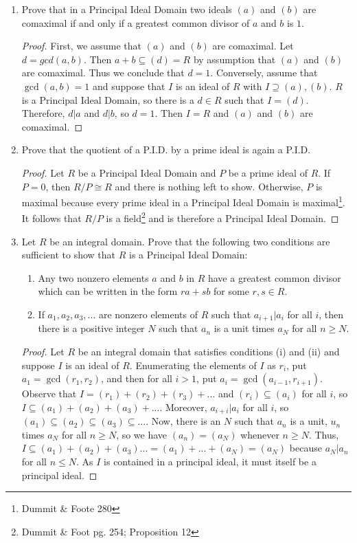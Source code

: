 \documentclass{report}
\begin{document}
\begin{enumerate}
	\item Prove that in a Principal Ideal Domain two ideals $(a)$ and $(b)$ are comaximal if and only if a greatest common divisor of $a$ and $b$ is $1$.
	\begin{proof}
		First, we assume that $(a)$ and $(b)$ are comaximal. Let $d=gcd(a,b)$. 
		Then $a+b\subseteq(d)=R$ by assumption that $(a)$ and $(b)$ are comaximal.
		Thus we conclude that $d=1$.
		Conversely, assume that $\gcd(a,b)=1$ and suppose that $I$ is an ideal of $R$ with $I\supseteq(a),(b)$.
		$R$ is a Principal Ideal Domain, so there is a $d\in R$ such that $I=(d)$.
		Therefore, $d|a$ and $d|b$, so $d=1$. Then $I=R$ and $(a)$ and $(b)$ are comaximal.
	\end{proof}
		
	\setcounter{enumi}{2} 
	\item Prove that the quotient of a P.I.D. by a prime ideal is again a P.I.D.
	\begin{proof}
	   Let $R$ be a Principal Ideal Domain and $P$ be a prime ideal of $R$. 
	   If $P=0$, then $R/P\cong R$ and there is nothing left to show.
	   Otherwise, $P$ is maximal because every prime ideal in a Principal Ideal Domain is maximal\footnote{Dummit \& Foote 280}.
	   It follows that $R/P$ is a field\footnote{Dummit \& Foot pg. 254; Proposition 12} and is therefore a Principal Ideal Domain.
	\end{proof}
	
	\item Let $R$ be an integral domain. Prove that the following two conditions are sufficient to show that $R$ is a Principal Ideal Domain:
		\begin{enumerate}[label=(\roman*)]
		\item Any two nonzero elements $a$ and $b$ in $R$ have a greatest common divisor which can be written in the form $ra +sb$ for some $r,s\in R$.
		\item If $a_1,a_2,a_3,...$ are nonzero elements of $R$ such that $a_{i+1}|a_i$ for all $i$,
		then there is a positive integer $N$ such that $a_n$ is a unit times $a_N$ for all $n\geq N$.
	\end{enumerate}
	\begin{proof}
		Let $R$ be an integral domain that satisfies conditions (i) and (ii) and suppose $I$ is an ideal of $R$.
		Enumerating the elements of $I$ as $r_i$, put $a_1=\gcd(r_1,r_2)$, and then for all $i>1$, put $a_i=\gcd(a_{i-1},r_{i+1})$.
		Observe that $I=(r_1)+(r_2)+(r_3)+...$ and $(r_{i})\subseteq(a_i)$ for all $i$, so $I\subseteq (a_1) + (a_2) +(a_3) + ...$.
		Moreover, $a_{i+i}|a_{i}$ for all $i$, so $(a_1)\subseteq (a_2)\subseteq (a_3)\subseteq...$. 
		Now, there is an $N$ such that $a_n$ is a unit, $u_n$ times $a_N$ for all $n\geq N$, so we have $(a_n)=(a_N)$ whenever $n\geq N$.
		Thus, $I\subseteq (a_1)+(a_2)+(a_3)...=(a_1) + ... + (a_N) = (a_N)$ because $a_N|a_n$ for all $n\leq N$.
		As $I$ is contained in a principal ideal, it must itself be a principal ideal.
	\end{proof}
			

\end{enumerate}
\end{document}
